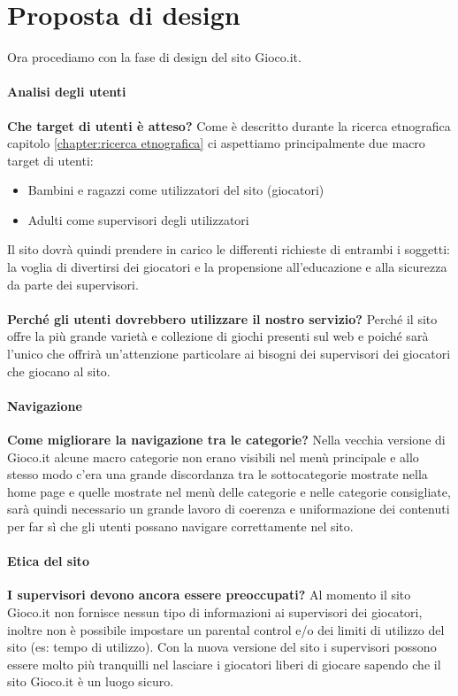 \documentclass[../Report.tex]{subfiles}
\begin{document}
    \chapter{Proposta di design}
    Ora procediamo con la fase di design del sito Gioco.it.
    \subsubsection{Analisi degli utenti}
    \textbf{Che target di utenti è atteso?} Come è descritto durante la ricerca etnografica capitolo \ref{chapter:ricerca etnografica} ci aspettiamo principalmente due macro target di utenti:
    \begin{itemize}
        \item Bambini e ragazzi come utilizzatori del sito (giocatori)
        \item Adulti come supervisori degli utilizzatori 
    \end{itemize}

    Il sito dovrà quindi prendere in carico le differenti richieste di entrambi i soggetti: la voglia di divertirsi dei giocatori e la propensione all'educazione e alla sicurezza da parte dei supervisori.\\
    \\
    \textbf{Perché gli utenti dovrebbero utilizzare il nostro servizio?} Perché il sito offre la più grande varietà e collezione di giochi presenti sul web e poiché sarà l'unico che offrirà un'attenzione particolare ai bisogni dei supervisori dei giocatori che giocano al sito.

    \subsubsection{Navigazione}
    \textbf{Come migliorare la navigazione tra le categorie?} Nella vecchia versione di Gioco.it alcune macro categorie non erano visibili nel menù principale e allo stesso modo c'era una grande discordanza tra le sottocategorie mostrate nella home page e quelle mostrate nel menù delle categorie e nelle categorie consigliate, sarà quindi necessario un grande lavoro di coerenza e uniformazione dei contenuti per far sì che gli utenti possano navigare correttamente nel sito.

    \subsubsection{Etica del sito}
    \textbf{I supervisori devono ancora essere preoccupati?} Al momento il sito Gioco.it non fornisce nessun tipo di informazioni ai supervisori dei giocatori, inoltre non è possibile impostare un parental control e/o dei limiti di utilizzo del sito (es: tempo di utilizzo). Con la nuova versione del sito i supervisori possono essere molto più tranquilli nel lasciare i giocatori liberi di giocare sapendo che il sito Gioco.it è un luogo sicuro.
\end{document}

